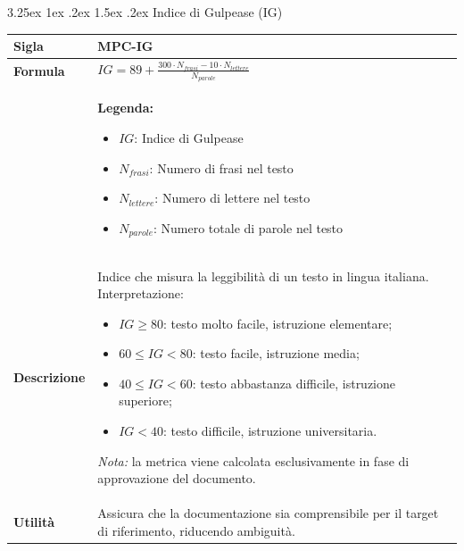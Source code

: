 \documentclass[a4paper, 10pt]{article}
\makeatletter
\renewcommand\paragraph{\@startsection{paragraph}{4}{\z@}%
  {3.25ex \@plus1ex \@minus .2ex}%
  {1.5ex \@plus .2ex}%
  {\normalfont\normalsize\bfseries}}
\makeatother
\begin{document}
\paragraph{Indice di Gulpease (IG)}
\mbox{} \\
\noindent
\begin{minipage}{\textwidth}
    \begin{tabularx}{\textwidth}{|>{\columncolor{bluBitless!10}\bfseries}p{3.5cm}|X|}
        \hline
        Sigla & MPC-IG \\ \hline
        Formula &  
        \textit{$IG = 89 + \frac{300 \cdot N_{frasi} - 10 \cdot N_{lettere}}{N_{parole}}$} \vspace{2mm} \\
        & \small \textbf{Legenda:}
        \begin{itemize}
            \item $IG$: Indice di Gulpease
            \item $N_{frasi}$: Numero di frasi nel testo
            \item $N_{lettere}$: Numero di lettere nel testo
            \item $N_{parole}$: Numero totale di parole nel testo
        \end{itemize} \\ \hline
        Descrizione & Indice che misura la leggibilità di un testo in lingua italiana. Interpretazione:
        \begin{itemize}
            \item $IG \ge 80$: testo molto facile, istruzione elementare;
            \item $60 \le IG < 80$: testo facile, istruzione media;
            \item $40 \le IG < 60$: testo abbastanza difficile, istruzione superiore;
            \item $IG < 40$: testo difficile, istruzione universitaria.
        \end{itemize}
        \textit{Nota:} la metrica viene calcolata esclusivamente in fase di approvazione del documento. \\ \hline
        Utilità & Assicura che la documentazione sia comprensibile per il target di riferimento, riducendo ambiguità. \\ \hline
    \end{tabularx}
\end{minipage}

\vspace{1cm}
\end{document}
